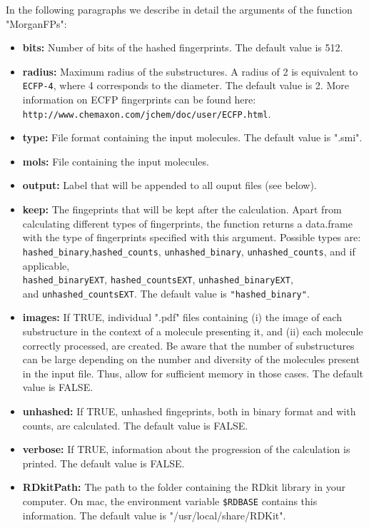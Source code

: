 \documentclass[twoside,a4wide,12pt]{article}\usepackage[]{graphicx}\usepackage[]{color}
\begin{document}
In the following paragraphs we describe in detail the arguments of the function "MorganFPs":
\begin{itemize}
\item {\bf bits:} Number of bits of the hashed fingerprints. The default value is 512.
\item {\bf radius:} Maximum radius of the substructures. A radius of 2 is equivalent to \verb|ECFP-4|, where 4 corresponds to the diameter. The default value is 2.
More information on ECFP fingerprints can be found here:\\
\verb|http://www.chemaxon.com/jchem/doc/user/ECFP.html|.
\item {\bf type:} File format containing the input molecules. The default value is ".smi".
\item {\bf mols:} File containing the input molecules.
\item {\bf output:} Label that will be appended to all ouput files (see below).
\item {\bf keep:} The fingeprints that will be kept after the calculation.
Apart from calculating different types of fingerprints, the function returns a data.frame with the type of fingerprints specified with this argument.  Possible types are: \verb|hashed_binary|,\verb|hashed_counts|, \verb|unhashed_binary|, \verb|unhashed_counts|, and if applicable,\\
\verb|hashed_binaryEXT|, \verb|hashed_countsEXT|, \verb|unhashed_binaryEXT|,\\
and \verb|unhashed_countsEXT|.
The default value is \verb|"hashed_binary"|.
\item {\bf images:} If TRUE, individual ".pdf" files containing (i) the image of each substructure in the context of a molecule presenting it, and (ii) each molecule correctly processed, are created.  Be aware that the number of substructures can be large depending on the number and diversity of the molecules present in the input file. Thus, allow for sufficient memory in those cases.
The default value is FALSE.
\item {\bf unhashed:} If TRUE, unhashed fingeprints, both in binary format and with counts, are calculated. The default value is FALSE.
\item {\bf verbose:} If TRUE, information about the progression of the calculation is printed. The default value is FALSE.
\item {\bf RDkitPath:} The path to the folder containing the RDkit library in your computer. On mac, the environment variable \verb|$RDBASE| contains this information. The default value is "/usr/local/share/RDKit".

\end{itemize}
\end{document}
